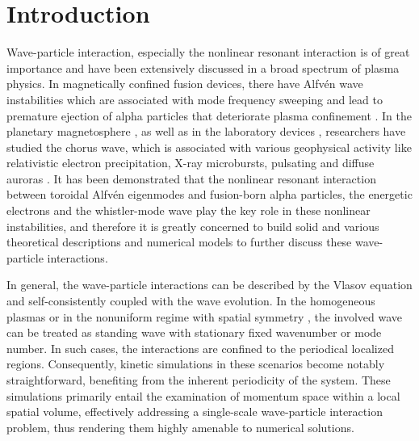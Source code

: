 \section{Introduction}
Wave-particle interaction, especially the nonlinear resonant interaction is of great importance and have been extensively discussed in a broad spectrum of plasma physics. 
In magnetically confined fusion devices, there have Alfv\'en wave instabilities \cite{chen2016,wang2018} which are associated with mode frequency sweeping and lead to premature ejection of alpha particles that deteriorate plasma confinement \cite{fasoli2007}.
In the planetary magnetosphere \cite{tsurutani1974}, as well as in the laboratory devices \cite{vancompernolle2015,vancompernolle2017a}, researchers have studied the chorus wave, which is associated with various geophysical activity like relativistic electron precipitation, X-ray microbursts, pulsating and diffuse auroras \cite{kasahara2018,reeves2013,thorne2013}.
It has been demonstrated that the nonlinear resonant interaction between toroidal Alfv\'en eigenmodes and fusion-born alpha particles, the energetic electrons and the whistler-mode wave play the key role in these nonlinear instabilities, and therefore it is greatly concerned to build solid and various theoretical descriptions and numerical models to further discuss these wave-particle interactions.

In general, the wave-particle interactions can be described by the Vlasov equation and self-consistently coupled with the wave evolution. 
In the homogeneous plasmas \cite{lilley2009,breizman2010} or in the nonuniform regime with spatial symmetry \cite{hezaveh2017,hezaveh2020,hezaveh2021}, the involved wave can be treated as standing wave with stationary fixed wavenumber or mode number. 
In such cases, the interactions are confined to the periodical localized regions. Consequently, kinetic simulations in these scenarios become notably straightforward, benefiting from the inherent periodicity of the system. These simulations primarily entail the examination of momentum space within a local spatial volume, effectively addressing a single-scale wave-particle interaction problem, thus rendering them highly amenable to numerical solutions.


